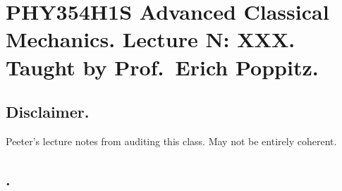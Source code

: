 
%

\chapter{PHY354H1S Advanced Classical Mechanics.  Lecture {N}: XXX.  Taught by Prof.\ Erich Poppitz.}
\label{chap:classicalMechanicsL{N}}
{}
\date{Mar XX, 2012}

\beginArtWithToc

\section{Disclaimer.}

Peeter's lecture notes from auditing this class.  May not be entirely coherent.

\section{.}

\EndArticle
